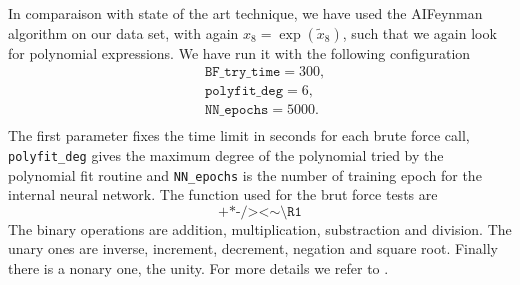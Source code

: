 \documentclass[11pt]{article}
\begin{document}
In comparaison with state of the art technique, we have used the AIFeynman algorithm on our data set, with again $x_8 = \exp(\tilde{x}_8)$, such that we again look for polynomial expressions. We have run it with the following configuration 
\begin{equation}
	\begin{aligned}
		&\texttt{BF\_try\_time} = 300, \\
		&\texttt{polyfit\_deg} = 6, \\
		&\texttt{NN\_epochs} = 5000.\\
	\end{aligned}
\end{equation}
The first parameter fixes the time limit in seconds for each brute force call, \texttt{polyfit\_deg} gives the maximum degree of the polynomial tried by the polynomial fit routine and \texttt{NN\_epochs} is the number of training epoch for the internal neural network. The function used for the brut force tests are 
\begin{equation}
\texttt{+*-/><} \sim \texttt{\textbackslash R1}
\end{equation}
The binary operations are addition, multiplication, substraction and division. The unary ones are inverse, increment, decrement, negation and square root. Finally there is a nonary one, the unity. For more details we refer to \cite{Udrescu:2019mnk}.
\end{document}
